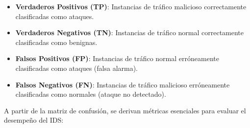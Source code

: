 \begin{itemize}

    \item\textbf{Verdaderos Positivos (TP)}: Instancias de tráfico malicioso correctamente clasificadas como ataques.
    
    \item\textbf{Verdaderos Negativos (TN)}: Instancias de tráfico normal correctamente clasificadas como benignas.
    
    \item\textbf{Falsos Positivos (FP)}: Instancias de tráfico normal erróneamente clasificadas como ataques (falsa alarma).
    
    \item\textbf{Falsos Negativos (FN)}: Instancias de tráfico malicioso erróneamente clasificadas como normales (ataque no detectado).

\end{itemize}

A partir de la matriz de confusión, se derivan métricas esenciales para evaluar el desempeño del IDS:

